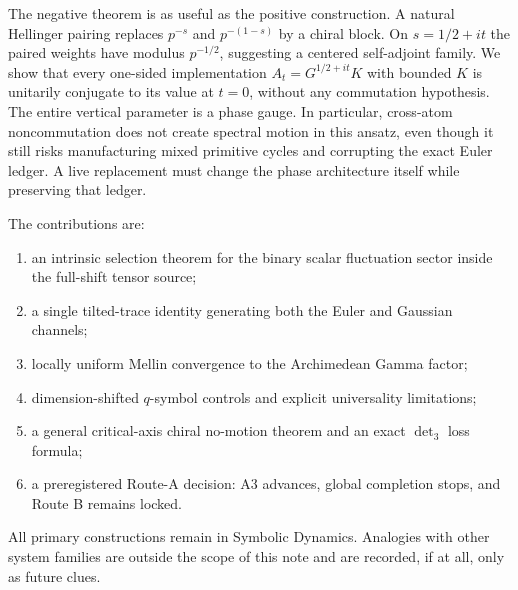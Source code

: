 The negative theorem is as useful as the positive construction. A natural
Hellinger pairing replaces $p^{-s}$ and $p^{-(1-s)}$ by a chiral block. On
$s=1/2+it$ the paired weights have modulus $p^{-1/2}$, suggesting a centered
self-adjoint family. We show that every one-sided implementation
$A_t=G^{1/2+it}K$ with bounded $K$ is unitarily conjugate to its value at
$t=0$, without any commutation hypothesis. The entire vertical parameter is
a phase gauge. In particular, cross-atom noncommutation does not create
spectral motion in this ansatz, even though it still risks manufacturing mixed
primitive cycles and corrupting the exact Euler ledger. A live replacement
must change the phase architecture itself while preserving that ledger.

The contributions are:
\begin{enumerate}
  \item an intrinsic selection theorem for the binary scalar fluctuation
        sector inside the full-shift tensor source;
  \item a single tilted-trace identity generating both the Euler and Gaussian
        channels;
  \item locally uniform Mellin convergence to the Archimedean Gamma factor;
  \item dimension-shifted $q$-symbol controls and explicit universality
        limitations;
  \item a general critical-axis chiral no-motion theorem and an exact
        $\det_3$ loss formula;
  \item a preregistered Route-A decision: A3 advances, global completion
        stops, and Route B remains locked.
\end{enumerate}

All primary constructions remain in Symbolic Dynamics. Analogies with other
system families are outside the scope of this note and are recorded, if at
all, only as future clues.
